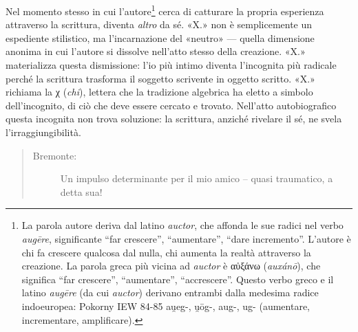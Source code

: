 Nel momento stesso in cui l'autore\footnote{%
  La parola autore deriva dal latino \emph{auctor}, che affonda le sue radici
  nel verbo \emph{augēre}, significante “far crescere”, “aumentare”, “dare
  incremento”. L'autore è chi fa crescere qualcosa dal nulla, chi aumenta la
  realtà attraverso la creazione. La parola greca più vicina ad \emph{auctor} è
  \textgreek{αὐξάνω} (\emph{auxánō}), che significa “far crescere”, “aumentare”,
  “accrescere”. Questo verbo greco e il latino \emph{augēre} (da cui \emph{auctor})
  derivano entrambi dalla medesima radice indoeuropea: Pokorny IEW 84-85
  {\phonfont *au̯eg-, u̯ōg-, aug-, ug-} (aumentare, incrementare, amplificare).
} cerca di catturare la propria esperienza
attraverso la scrittura, diventa \emph{altro} da sé. «X.» non è
semplicemente un espediente stilistico, ma l'incarnazione del «neutro» \cite{blanchot82} — quella dimensione anonima in cui l'autore
si dissolve nell'atto stesso della creazione. «X.» materializza questa dismissione: l'io più intimo diventa l'incognita
più radicale perché la scrittura trasforma il soggetto scrivente in oggetto scritto.
«X.» richiama la \textgreek{χ} (\emph{chi}), lettera che la tradizione algebrica
ha eletto a simbolo dell'incognito, di ciò che deve essere cercato e trovato.
Nell'atto autobiografico questa incognita non trova soluzione: la scrittura,
anziché rivelare il sé, ne svela l'irraggiungibilità.






\begin{quote}
  \begin{sf}
    \small
    \begin{description}
      \item[Bremonte:] %
      Un impulso determinante per il mio amico – quasi traumatico, a detta sua!
    \end{description}
  \end{sf}
\end{quote}

